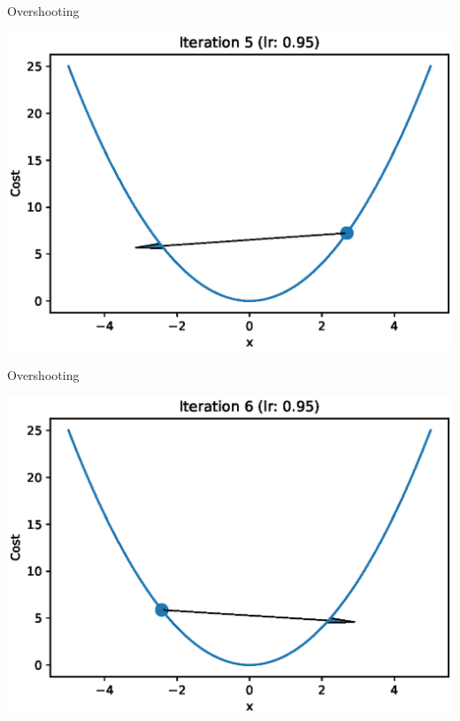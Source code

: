 \documentclass{beamer}
\begin{document}
	\begin{frame}{Overshooting}
		\begin{center}
			\includegraphics[totalheight=6cm]{gradient-descent/overshooting-5.eps}
		\end{center}
	\end{frame}
	
	\begin{frame}{Overshooting}
		\begin{center}
			\includegraphics[totalheight=6cm]{gradient-descent/overshooting-6.eps}
		\end{center}
	\end{frame}
	
\end{document}
